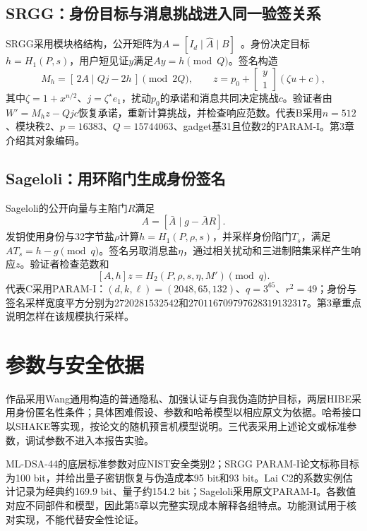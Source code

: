 \subsection{SRGG：身份目标与消息挑战进入同一验签关系}
SRGG采用模块格结构，公开矩阵为$A=[I_d\mid\widehat A\mid B]$~\cite{jia2025ibs}。身份决定目标$h=H_1(P,s)$，用户短见证$y$满足$Ay=h\pmod Q$。签名构造
\[
 M_h=[\,2A\mid Qj-2h\,]\pmod{2Q},\qquad
 z=p_0+\begin{bmatrix}y\\1\end{bmatrix}(\zeta u+c),
\]
其中$\zeta=1+x^{n/2}$、$j=\zeta^\star e_1$，扰动$p_0$的承诺和消息共同决定挑战$c$。验证者由$W'=M_hz-Qjc$恢复承诺，重新计算挑战，并检查响应范数。代表B采用$n=512$、模块秩2、$p=16383$、$Q=15744063$、gadget基31且位数2的PARAM-I。第3章介绍其对象编码。

\subsection{Sageloli：用环陷门生成身份签名}
Sageloli的公开向量与主陷门$R$满足~\cite{sageloli2023ibs}
\[
 A=[\bar A\mid g-\bar AR].
\]
发钥使用身份与32字节盐$\rho$计算$h=H_1(P,\rho,s)$，并采样身份陷门$T_s$，满足$AT_s=h-g\pmod q$。签名另取消息盐$\eta$，通过相关扰动和三进制陪集采样产生响应$z$。验证者检查范数和
\[
 [A,h]z=H_2(P,\rho,s,\eta,M')\pmod q.
\]
代表C采用PARAM-I：$(d,k,\ell)=(2048,65,132)$、$q=3^{65}$、$r^2=49$；身份与签名采样宽度平方分别为$2720281532542$和$270116709797628319132317$。第3章重点说明怎样在该规模执行采样。

\section{参数与安全依据}
作品采用Wang通用构造的普通隐私、加强认证与自我伪造防护目标，两层HIBE采用身份匿名性条件；具体困难假设、参数和哈希模型以相应原文为依据。哈希接口以SHAKE等实现，按论文的随机预言机模型说明。三代表采用上述论文或标准参数，调试参数不进入本报告实验。

ML-DSA-44的底层标准参数对应NIST安全类别2；SRGG PARAM-I论文标称目标为100 bit，并给出量子密钥恢复与伪造成本95 bit和93 bit。Lai C2的系数实例估计记录为经典约169.9 bit、量子约154.2 bit；Sageloli采用原文PARAM-I。各数值对应不同部件和模型，因此第5章以完整实现成本解释各组特点。功能测试用于核对实现，不能代替安全性论证。
